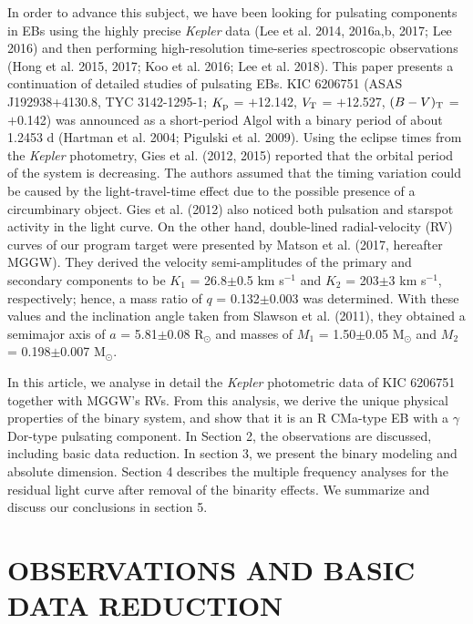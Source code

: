 \documentclass[useAMS,usenatbib,usegraphicx]{mn2e}
\begin{document}
In order to advance this subject, we have been looking for pulsating components in EBs using the highly precise {\it Kepler} 
data (Lee et al. 2014, 2016a,b, 2017; Lee 2016) and then performing high-resolution time-series spectroscopic observations 
(Hong et al. 2015, 2017; Koo et al. 2016; Lee et al. 2018). This paper presents a continuation of detailed studies of pulsating EBs. 
KIC 6206751 (ASAS J192938+4130.8, TYC 3142-1295-1; $K_{\rm p}$ = $+$12.142, $V\rm_T$ = $+$12.527, $(B-V)\rm_T$ = $+$0.142) 
was announced as a short-period Algol with a binary period of about 1.2453 d (Hartman et al. 2004; Pigulski et al. 2009). 
Using the eclipse times from the {\it Kepler} photometry, Gies et al. (2012, 2015) reported that the orbital period of 
the system is decreasing. The authors assumed that the timing variation could be caused by the light-travel-time effect 
due to the possible presence of a circumbinary object. Gies et al. (2012) also noticed both pulsation and starspot activity 
in the light curve. On the other hand, double-lined radial-velocity (RV) curves of our program target were presented by 
Matson et al. (2017, hereafter MGGW). They derived the velocity semi-amplitudes of the primary and secondary components to be 
$K_1$ = 26.8$\pm$0.5 km s$^{-1}$ and $K_2$ = 203$\pm$3 km s$^{-1}$, respectively; hence, a mass ratio of $q$ = 0.132$\pm$0.003 
was determined. With these values and the inclination angle taken from Slawson et al. (2011), they obtained a semimajor axis 
of $a$ = 5.81$\pm$0.08 R$_\odot$ and masses of $M_1$ = 1.50$\pm$0.05 M$_\odot$ and $M_2$ = 0.198$\pm$0.007 M$_\odot$. 

In this article, we analyse in detail the {\it Kepler} photometric data of KIC 6206751 together with MGGW's RVs. 
From this analysis, we derive the unique physical properties of the binary system, and show that it is an R CMa-type EB 
with a $\gamma$ Dor-type pulsating component. In Section 2, the observations are discussed, including basic data reduction. 
In section 3, we present the binary modeling and absolute dimension. Section 4 describes the multiple frequency analyses 
for the residual light curve after removal of the binarity effects. We summarize and discuss our conclusions in section 5. 


\section{OBSERVATIONS AND BASIC DATA REDUCTION}
\end{document}

